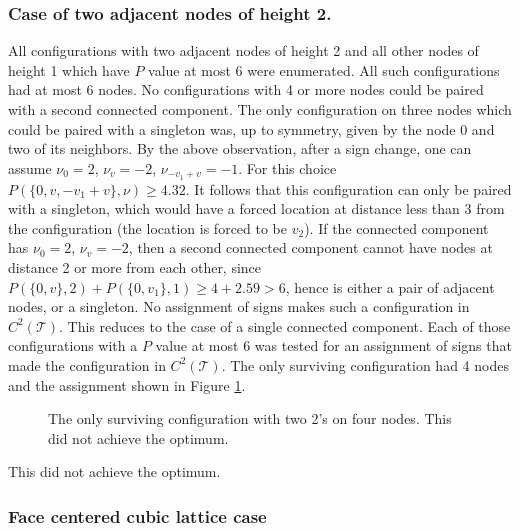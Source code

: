 \documentclass[a4paper, 12pt, notitlepage]{amsart}
\newcommand{\sT}{\mathscr{T}}
\theoremstyle{remark}
\begin{document}
\subsubsection*{ Case of two adjacent nodes of height 2.}  
  All configurations with two adjacent nodes of height 2 and all other nodes of height 1 which have $P$ value at most $6$ were enumerated.  All such configurations had at most 6 nodes.  No configurations with 4 or more nodes could be paired with a second connected component.  The only configuration on three nodes which could be paired with a singleton was, up to symmetry, given by the node 0 and two of its neighbors. By the above observation, after a sign change, one can assume $\nu_0 = 2$, $\nu_v = -2$, $\nu_{-v_1 + v} = -1$.  For this choice $P(\{0, v, -v_1+v\}, \nu) \geq 4.32$.  It follows that this configuration can only be paired with a singleton, which would have a forced location at distance less than 3 from the configuration (the location is forced to be $v_2$).  If the connected component has $\nu_0 = 2$, $\nu_v = -2$, then a second connected component cannot have nodes at distance 2 or more from each other, since $P(\{0, v\}, 2) + P(\{0, v_1\},1)\geq 4 + 2.59 > 6$, hence is either a pair of adjacent nodes, or a singleton.  No assignment of signs makes such a configuration in $C^2(\sT)$.  This reduces to the case of a single connected component.  Each of those configurations with a $P$ value at most 6 was tested for an assignment of signs that made the configuration in $C^2(\sT)$.  The only surviving configuration had 4 nodes and  the assignment shown in Figure \ref{fig:2_twos}.
 \begin{figure}
 \caption{The only surviving configuration with two 2's on four nodes.  This did not achieve the optimum.}
 \label{fig:2_twos}
 \end{figure}
 This did not achieve the optimum.

\subsubsection{Face centered cubic lattice case} \label{fcc_section}
\end{document}
